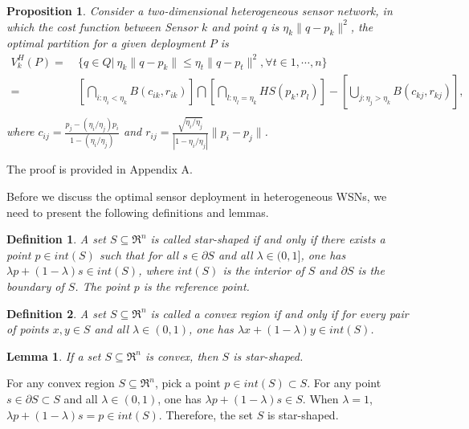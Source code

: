 \documentclass[journal,draftcls,onecolumn,12pt,twoside, narroweqnarray]{IEEEtran}
\newtheorem{prop}{Proposition}
\newtheorem{Def}{Definition}
\newtheorem{Lemma}{Lemma}
\begin{document}
\begin{prop}
\label{Proposition.1}
Consider a two-dimensional heterogeneous sensor network, in which the cost function between Sensor $k$ and point $q$ is $\eta_k\|q-p_k\|^2$, the optimal partition for a given deployment $P$ is
\begin{equation}
\begin{aligned}
V^H_k(P) {=}&\:\{q \in Q |\ \eta_k\|q-p_k\| \le \eta_t\|q-p_t\|^2, \forall t \in 1,\cdots,n\}\\
         {=}&\:\left[\bigcap_{i:\eta_i<\eta_k}{B(c_{ik},r_{ik})}\right]\bigcap\left[\bigcap_{l:\eta_l=\eta_k}{HS(p_k,p_l)}\right] - \left[\bigcup_{j:\eta_j>\eta_k}{B(c_{kj},r_{kj})}\right],\\
\end{aligned}
\end{equation}
where $c_{ij}=\frac{p_j-(\eta_i/\eta_j)p_i}{1-(\eta_i/\eta_j)}$ and $r_{ij}=\frac{\sqrt{\eta_i/\eta_j}}{|1-\eta_i/\eta_j|}\|p_i-p_j\|$.
\end{prop}
\begin{IEEEproof}
The proof is provided in Appendix A.
\end{IEEEproof}
Before we discuss the optimal sensor deployment in heterogeneous WSNs, we need to present the following definitions and lemmas.
\begin{Def}
A set $S\subseteq \Re^n$ is called star-shaped if and only if there exists a point $p\in int(S)$ such that for all $s\in \partial S$ and all $\lambda \in (0,1]$, one has $\lambda p+(1-\lambda)s\in int(S)$, where $int(S)$ is the interior of $S$ and $\partial S$ is the boundary of $S$. The point $p$ is the reference point.
\end{Def}
\begin{Def}
A set $S\subseteq \Re^n$ is called a convex region if and only if for every pair of points $x,y\in S$ and all $\lambda \in (0,1)$, one has $\lambda x+(1-\lambda)y\in int(S)$.
\end{Def}
\begin{Lemma}
\label{a}
If a set $S\subseteq \Re^n$ is convex, then $S$ is star-shaped.
\end{Lemma}
\begin{IEEEproof}
For any convex region $S\subseteq \Re^n$, pick a point $p\in int(S)\subset S$. For any point $s\in \partial S\subset S$ and all $\lambda \in (0,1)$, one has $\lambda p+(1-\lambda)s\in S$. When $\lambda=1$, $\lambda p+(1-\lambda)s = p\in int(S)$. Therefore, the set $S$ is star-shaped.
\end{IEEEproof}
\end{document}
